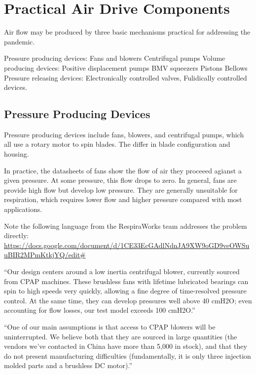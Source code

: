 \documentclass[conference]{article}
\begin{document}
\section{Practical Air Drive Components}

Air flow may be produced by three basic mechanisms practical for addressing the pandemic.

\begin{outline}
  \1 Pressure producing devices:
  \2 Fans and blowers
  \2 Centrifugal pumps
  \1 Volume producing devices:
  \2 Positive displacement pumps
  \2 BMV squeezers
  \2 Pistons
  \2 Bellows
  \1 Pressure releasing devices:
  \2 Electronically controlled valves,
  \2 Fulidically controlled devices.
\end{outline}


\subsection{Pressure Producing Devices}

Pressure producing devices include fans, blowers, and centrifugal pumps, which
all use a rotary motor to spin blades. The differ in blade configuration and
housing.

In practice, the datasheets of fans show the flow of air they proceeed agianst a given pressure. At some pressure,
this flow drops to zero. In general, fans are provide high flow but develop low pressure. They are generally unsuitable
for respiration, which requires lower flow and higher pressure
compared with most applications.


Note the following language from the RespiraWorks team addresses the problem directly:
\url{https://docs.google.com/document/d/1CE33EcGAdlNdnJA9XW9oGD9veOWSuuBIR2MPmKtkjYQ/edit#}

``Our design centers around a low inertia centrifugal blower, currently sourced from CPAP machines. These brushless fans with lifetime lubricated bearings can spin to high speeds very quickly, allowing a fine degree of time-resolved pressure control. At the same time, they can develop pressures well above 40 cmH2O; even accounting for flow losses, our test model exceeds 100 cmH2O.''

``One of our main assumptions is that access to CPAP blowers will be uninterrupted. We believe both that they are sourced in large quantities (the vendors we’ve contacted in China have more than 5,000 in stock), and that they do not present manufacturing difficulties (fundamentally, it is only three injection molded parts and a brushless DC motor).''
\end{document}
